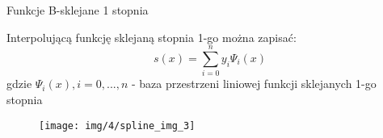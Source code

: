     
    
    
   \begin{frame}{Funkcje B-sklejane 1 stopnia}
   		\begin{exampleblock}{}
   			Interpolującą funkcję sklejaną stopnia 1-go można zapisać:
            \[
            	s(x)=\sum_{i=0}^{n}y_{i}\Psi_{i}(x)
            \]
            gdzie $\Psi_{i}(x), i=0,...,n$ - baza przestrzeni liniowej funkcji sklejanych
            1-go stopnia
   		\end{exampleblock}
        \begin{figure}[h]
			\texttt{[image: img/4/spline\_img\_3]}
		\end{figure}
   \end{frame}
    
    
    
    
    
    
    
    
    
    
    
    
    
    
    
    
    
    